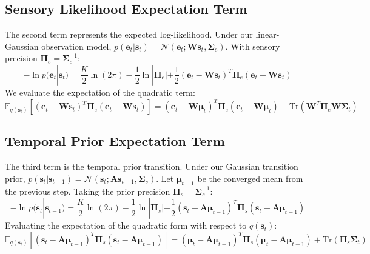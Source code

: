 \documentclass{article}
\theoremstyle{plain}
\theoremstyle{definition}
\theoremstyle{remark}
\begin{document}
\subsection{Sensory Likelihood Expectation Term}
The second term represents the expected log-likelihood. Under our linear-Gaussian observation model, $p(\mathbf{e}_t | \mathbf{s}_t) = \mathcal{N}(\mathbf{e}_t; \mathbf{W}\mathbf{s}_t, \mathbf{\Sigma}_e)$. With sensory precision $\mathbf{\Pi}_e = \mathbf{\Sigma}_e^{-1}$:
\begin{equation}
-\ln p(\mathbf{e}_t | \mathbf{s}_t) = \frac{K}{2}\ln(2\pi) - \frac{1}{2}\ln|\mathbf{\Pi}_e| + \frac{1}{2} (\mathbf{e}_t - \mathbf{W}\mathbf{s}_t)^T \mathbf{\Pi}_e (\mathbf{e}_t - \mathbf{W}\mathbf{s}_t)
\end{equation}
We evaluate the expectation of the quadratic term:
\begin{equation}
\mathbb{E}_{q(\mathbf{s}_t)} \left[ (\mathbf{e}_t - \mathbf{W}\mathbf{s}_t)^T \mathbf{\Pi}_e (\mathbf{e}_t - \mathbf{W}\mathbf{s}_t) \right] = (\mathbf{e}_t - \mathbf{W}\mathbf{\mu}_t)^T \mathbf{\Pi}_e (\mathbf{e}_t - \mathbf{W}\mathbf{\mu}_t) + \text{Tr}\left(\mathbf{W}^T \mathbf{\Pi}_e \mathbf{W} \mathbf{\Sigma}_t\right)
\end{equation}

\subsection{Temporal Prior Expectation Term}
The third term is the temporal prior transition. Under our Gaussian transition prior, $p(\mathbf{s}_t | \mathbf{s}_{t-1}) = \mathcal{N}(\mathbf{s}_t; \mathbf{A}\mathbf{s}_{t-1}, \mathbf{\Sigma}_s)$. Let $\mathbf{\mu}_{t-1}$ be the converged mean from the previous step. Taking the prior precision $\mathbf{\Pi}_s = \mathbf{\Sigma}_s^{-1}$:
\begin{equation}
-\ln p(\mathbf{s}_t | \mathbf{s}_{t-1}) = \frac{K}{2}\ln(2\pi) - \frac{1}{2}\ln|\mathbf{\Pi}_s| + \frac{1}{2} (\mathbf{s}_t - \mathbf{A}\mathbf{\mu}_{t-1})^T \mathbf{\Pi}_s (\mathbf{s}_t - \mathbf{A}\mathbf{\mu}_{t-1})
\end{equation}
Evaluating the expectation of the quadratic form with respect to $q(\mathbf{s}_t)$:
\begin{equation}
\mathbb{E}_{q(\mathbf{s}_t)} \left[ (\mathbf{s}_t - \mathbf{A}\mathbf{\mu}_{t-1})^T \mathbf{\Pi}_s (\mathbf{s}_t - \mathbf{A}\mathbf{\mu}_{t-1}) \right] = (\mathbf{\mu}_t - \mathbf{A}\mathbf{\mu}_{t-1})^T \mathbf{\Pi}_s (\mathbf{\mu}_t - \mathbf{A}\mathbf{\mu}_{t-1}) + \text{Tr}\left(\mathbf{\Pi}_s \mathbf{\Sigma}_t\right)
\end{equation}
\end{document}
